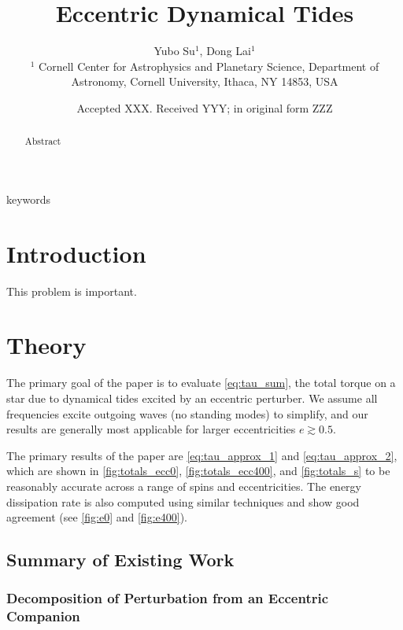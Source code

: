 \documentclass[
        fleqn,
        usenatbib,
        referee,
    ]{mnras}
\title[Eccentric Dynamical Tides]{Eccentric Dynamical Tides}
\author[Y. Su, D. Lai.]{
Yubo Su$^1$,
Dong Lai$^1$
\\
$^1$ Cornell Center for Astrophysics and Planetary Science, Department of
Astronomy, Cornell University, Ithaca, NY 14853, USA
}
\date{Accepted XXX\@. Received YYY\@; in original form ZZZ}
\begin{document}
\label{firstpage}
\pagerange{\pageref{firstpage}--\pageref{lastpage}}
\renewcommand*{\sectionautorefname}{Section}
\maketitle

\begin{abstract}
    Abstract
\end{abstract}

\begin{keywords}
keywords %
\end{keywords}

\section{Introduction}

This problem is important.

\section{Theory}

The primary goal of the paper is to evaluate \autoref{eq:tau_sum}, the total
torque on a star due to dynamical tides excited by an eccentric perturber. We
assume all frequencies excite outgoing waves (no standing modes) to simplify,
and our results are generally most applicable for larger eccentricities $e
\gtrsim 0.5$.

The primary results of the paper are \autoref{eq:tau_approx_1} and
\autoref{eq:tau_approx_2}, which are shown in \autoref{fig:totals_ecc0},
\autoref{fig:totals_ecc400}, and \autoref{fig:totals_s} to be reasonably
accurate across a range of spins and eccentricities. The energy dissipation rate
is also computed using similar techniques and show good agreement (see
\autoref{fig:e0} and \autoref{fig:e400}).

\subsection{Summary of Existing Work}

\subsubsection{Decomposition of Perturbation from an Eccentric Companion}
\end{document}
